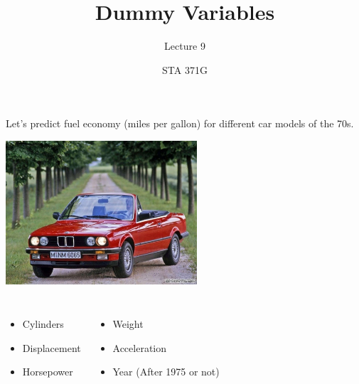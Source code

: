 \documentclass{beamer}\usepackage[]{graphicx}\usepackage[]{color}
\title{Dummy Variables}
\subtitle{Lecture 9}
\author{STA 371G}
\begin{document}
  
  
  

  \frame{\maketitle}



  \begin{darkframes}
    \begin{frame}
      \fontsize{9}{9}\selectfont
      Let's predict fuel economy (miles per gallon) for different car models of the 70s.
      
      \begin{center}
        \includegraphics[width=2.8in]{bmw} \\
      \end{center} \pause
      
      \begin{columns}[onlytextwidth]
          \begin{itemize}
            \item Cylinders
            \item Displacement
            \item Horsepower
          \end{itemize}
          \begin{itemize}
            \item Weight
            \item Acceleration
            \item Year (After 1975 or not)
          \end{itemize}
      \end{columns}
    \end{frame}
    

\end{darkframes}
\end{document}
